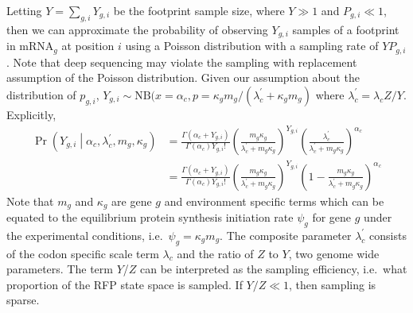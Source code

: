 \documentclass{article}
\newcommand{\alphac}{\ensuremath{{\alpha_c}}\xspace}
\newcommand{\lambdac}{\ensuremath{{\lambda_c}}\xspace}
\newcommand{\lambdacprime}{\ensuremath{{\lambda_c^\prime}}\xspace}
\newcommand{\pgi}{\ensuremath{{p_{g,i}}}\xspace}
\newcommand{\Pgi}{\ensuremath{{P_{g,i}}}\xspace}
\newcommand{\mg}{\ensuremath{{m_g}}\xspace}
\newcommand{\psig}{\ensuremath{{\psi_g}}\xspace}
\newcommand{\kappag}{\ensuremath{{\kappa_{g}}}\xspace}
\newcommand{\Ztheta}{\ensuremath{{Z}}\xspace}
\newcommand{\mRNAg}{mRNA$_g$\xspace}
\newcommand{\Ytotal}{\ensuremath{{Y}}\xspace}
\newcommand{\Ygi}{\ensuremath{{Y_{g,i}}}\xspace}
\begin{document}
Letting $\Ytotal = \sum_{g,i}\Ygi$ be the footprint sample size, where $\Ytotal \gg 1$ and $\Pgi \ll 1$, then we can approximate the probability of observing $\Ygi$ samples of a footprint in \mRNAg at position $i$ using a Poisson distribution with a sampling rate of $\Ytotal \Pgi$.
Note that deep sequencing may violate the sampling with replacement assumption of the Poisson distribution.
Given our assumption about the distribution of $\pgi$,  $\Ygi \sim \text{NB}(x = \alphac, p = \kappag \mg /(\lambdacprime + \kappag \mg)$ where $\lambdacprime = \lambdac \Ztheta/\Ytotal$.
Explicitly,
\begin{align}
  \Pr\left(\Ygi \middle| \alphac, \lambdacprime, \mg, \kappag\right) &= \frac{\Gamma\left(\alphac + \Ygi\right)}{\Gamma\left(\alphac\right) \Ygi!} 
  \left(\frac{\mg \kappag}{\lambdacprime + \mg \kappag}\right)^\Ygi \left(\frac{\lambdacprime}{\lambdacprime + \mg \kappag}\right)^\alphac \nonumber\\
  \label{eq:distYgSite}
  &=\frac{\Gamma\left(\alphac + \Ygi\right)}{\Gamma\left(\alphac\right) \Ygi!} 
  \left(\frac{\mg \kappag}{\lambdacprime + \mg \kappag}\right)^\Ygi \left(1-\frac{\mg \kappag}{\lambdacprime + \mg \kappag}\right)^\alphac
\end{align}
Note that $\mg$ and \kappag are gene $g$ and environment specific terms which can be equated to the equilibrium protein synthesis initiation rate $\psig$ for gene $g$ under the experimental conditions, i.e.~$\psig = \kappag \mg$.
The composite parameter \lambdacprime consists of the codon specific scale term \lambdac and  the ratio of \Ztheta to \Ytotal, two genome wide parameters.
The term \Ytotal/\Ztheta can be interpreted as the sampling efficiency, i.e.~what proportion of the RFP state space is sampled.
If $\Ytotal/\Ztheta \ll 1$, then sampling is sparse.
\end{document}

